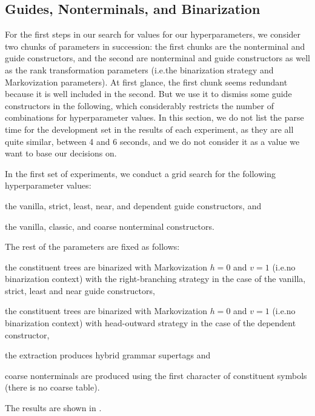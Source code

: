 \documentclass[../../document.tex]{subfiles}
\begin{document}
    \subsection{Guides, Nonterminals, and Binarization}\label{sec:gridsearch:nts-guides}
    For the first steps in our search for values for our hyperparameters, we consider two chunks of parameters in succession: the first chunks are the nonterminal and guide constructors, and the second are nonterminal and guide constructors as well as the rank transformation parameters (i.e.\@ the binarization strategy and Markovization parameters).
    At first glance, the first chunk seems redundant because it is well included in the second.
    But we use it to dismiss some guide constructors in the following, which considerably restricts the number of combinations for hyperparameter values.
    In this section, we do not list the parse time for the development set in the results of each experiment, as they are all quite similar, between 4 and 6 seconds, and we do not consider it as a value we want to base our decisions on.

    In the first set of experiments, we conduct a grid search for the following hyperparameter values:
    \begin{compactitem}
        \item the vanilla, strict, least, near, and dependent guide constructors, and
        \item the vanilla, classic, and coarse nonterminal constructors.
    \end{compactitem}
    The rest of the parameters are fixed as follows:
    \begin{compactitem}
        \item the constituent trees are binarized with Markovization \(h=0\) and \(v=1\) (i.e.\@ no binarization context) with the right-branching strategy in the case of the vanilla, strict, least and near guide constructors,
        \item the constituent trees are binarized with Markovization \(h=0\) and \(v=1\) (i.e.\@ no binarization context) with head-outward strategy in the case of the dependent constructor,
        \item the extraction produces hybrid grammar supertags and
        \item coarse nonterminals are produced using the first character of constituent symbols (there is no coarse table).
    \end{compactitem}
    The results are shown in .
    
\end{document}
